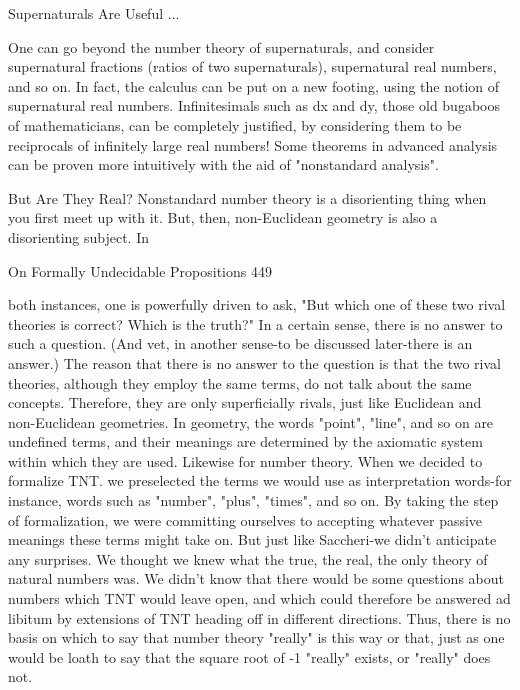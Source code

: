                                Supernaturals Are Useful ...

One can go beyond the number theory of supernaturals, and consider supernatural
fractions (ratios of two supernaturals), supernatural real numbers, and so on. In fact, the
calculus can be put on a new footing, using the notion of supernatural real numbers.
Infinitesimals such as dx and dy, those old bugaboos of mathematicians, can be
completely justified, by considering them to be reciprocals of infinitely large real
numbers! Some theorems in advanced analysis can be proven more intuitively with the
aid of "nonstandard analysis".

                                 But Are They Real?
Nonstandard number theory is a disorienting thing when you first meet up with it. But,
then, non-Euclidean geometry is also a disorienting subject. In




On Formally Undecidable Propositions                                                     449

both instances, one is powerfully driven to ask, "But which one of these two rival theories
is correct? Which is the truth?" In a certain sense, there is no answer to such a question.
(And vet, in another sense-to be discussed later-there is an answer.) The reason that there
is no answer to the question is that the two rival theories, although they employ the same
terms, do not talk about the same concepts. Therefore, they are only superficially rivals,
just like Euclidean and non-Euclidean geometries. In geometry, the words "point", "line",
and so on are undefined terms, and their meanings are determined by the axiomatic
system within which they are used.
         Likewise for number theory. When we decided to formalize TNT. we preselected
the terms we would use as interpretation words-for instance, words such as "number",
"plus", "times", and so on. By taking the step of formalization, we were committing
ourselves to accepting whatever passive meanings these terms might take on. But just like
Saccheri-we didn't anticipate any surprises. We thought we knew what the true, the real,
the only theory of natural numbers was. We didn't know that there would be some
questions about numbers which TNT would leave open, and which could therefore be
answered ad libitum by extensions of TNT heading off in different directions. Thus, there
is no basis on which to say that number theory "really" is this way or that, just as one
would be loath to say that the square root of -1 "really" exists, or "really" does not.

